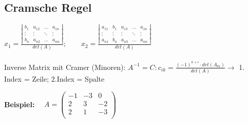 \subsection{Cramsche Regel}
	$x_1= \frac{\left|\begin{array}{cccc}
		b_1 & a_{12} & \ldots & a_{1n} \\
		\vdots & \vdots & \ddots & \vdots \\
		b_n & a_{n2} & \ldots & a_{nn} \end{array}\right|}{det(A)}; \qquad
	x_2 = \frac{\left|\begin{array}{ccccc}
		a_{11} & b_1 & a_{13} & \ldots & a_{1n}\\
		\vdots & \vdots & \vdots & \ddots & \vdots \\
		a_{n1} & b_n & a_{n3} & \ldots & a_{nn} \end{array}\right|}{det(A)}$ \\ \\
	Inverse Matrix mit Cramer (Minoren): $A^{-1} = C : c_{ik} = \frac{(-1)^{k+i} \cdot det(A_{ki})}{det(A)} \longrightarrow$ 1. Index = Zeile; 2.Index = Spalte
	
	\textbf{Beispiel:} \ \ 
		$A=\left(\begin{array}{rrr} 
				-1 & -3 & 0 \\
				2 & 3 & -2 \\
				2 & 1 & -3 \\
			\end{array}\right)$ \\ \ \\
			
